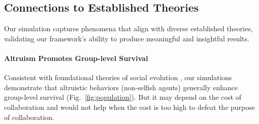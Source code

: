 \documentclass[letterpaper]{article} %
\begin{document}

\subsection{Connections to Established Theories}

Our simulation captures phenomena that align with diverse established theories, validating our framework’s ability to produce meaningful and insightful results.


\paragraph{Altruism Promotes Group-level Survival} 
Consistent with foundational theories of social evolution \citep{hamilton1964genetical,trivers1971evolution,boyd1987evolution,nowak1998dynamics}, our simulations demonstrate that altruistic behaviors (non-selfish agents) generally enhance group-level survival (Fig.~\ref {fig:population}). But it may depend on the cost of collaboration and would not help when the cost is too high to defeat the purpose of collaboration. 
\end{document}
